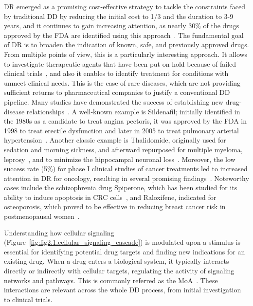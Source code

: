 \gls{DR} emerged as a promising cost-effective strategy to tackle the constraints faced by traditional \gls{DD} by reducing the initial cost to 1/3 and the duration to 3-9 years, and it continues to gain increasing attention, as nearly 30\% of the drugs approved by the FDA are identified using this approach~\cite{RN54,RN64}. 
The fundamental goal of \gls{DR} is to broaden the indication of known, safe, and previously approved drugs. 
From multiple points of view, this is a particularly interesting approach. 
It allows to investigate therapeutic agents that have been put on hold because of failed clinical trials~\cite{RN62}, and also it enables to identify treatment for conditions with unmeet clinical needs. 
This is the case of rare diseases, which are not providing sufficient returns to pharmaceutical companies to justify a conventional DD pipeline. 
Many studies have demonstrated the success of establishing new drug-disease relationships~\cite{RN48}. 
A well-known example is Sildenafil; initially identified in the 1980s as a candidate to treat angina pectoris, it was approved by the \gls{FDA} in 1998 to treat erectile dysfunction and later in 2005 to treat pulmonary arterial hypertension~\cite{RN54, RN64, RN94}. 
Another classic example is Thalidomide, originally used for sedation and morning sickness, and afterward repurposed for multiple myeloma, leprosy~\cite{RN54, RN64}, and to minimize the hippocampal neuronal loss~\cite{RN50}. Moreover, the low success rate (5\%) for phase I clinical studies of cancer treatments led to increased attention in DR for oncology, resulting in several promising findings~\cite{RN64, RN63}. 
Noteworthy cases include the schizophrenia drug Spiperone, which has been studied for its ability to induce apoptosis in \gls{CRC} cells~\cite{RN51}, and Raloxifene, indicated for osteoporosis, which proved to be effective in reducing breast cancer risk in postmenopausal women~\cite{RN64, RN61}.

Understanding how cellular signaling (Figure~\ref{fig:fig2.1.cellular_signaling_cascade}) is modulated upon a stimulus is essential for identifying potential drug targets and finding new indications for an existing drug. 
When a drug enters a biological system, it typically interacts directly or indirectly with cellular targets, regulating the activity of signaling networks and pathways. 
This is commonly referred as the \gls{MoA}~\cite{RN52, RN53}. These interactions are relevant across the whole \gls{DD} process, from initial investigation to clinical trials. 

